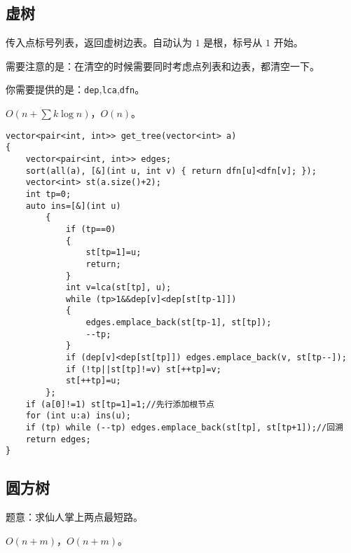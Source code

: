 \documentclass[12pt]{ctexart}
\begin{document}
\subsection{虚树}

传入点标号列表，返回虚树边表。自动认为 $1$ 是根，标号从 $1$ 开始。

需要注意的是：在清空的时候需要同时考虑点列表和边表，都清空一下。

你需要提供的是：\verb|dep|,\verb|lca|,\verb|dfn|。

$O(n+\sum k\log n)$，$O(n)$。

\begin{lstlisting}
vector<pair<int, int>> get_tree(vector<int> a)
{
	vector<pair<int, int>> edges;
	sort(all(a), [&](int u, int v) { return dfn[u]<dfn[v]; });
	vector<int> st(a.size()+2);
	int tp=0;
	auto ins=[&](int u)
		{
			if (tp==0)
			{
				st[tp=1]=u;
				return;
			}
			int v=lca(st[tp], u);
			while (tp>1&&dep[v]<dep[st[tp-1]])
			{
				edges.emplace_back(st[tp-1], st[tp]);
				--tp;
			}
			if (dep[v]<dep[st[tp]]) edges.emplace_back(v, st[tp--]);
			if (!tp||st[tp]!=v) st[++tp]=v;
			st[++tp]=u;
		};
	if (a[0]!=1) st[tp=1]=1;//先行添加根节点
	for (int u:a) ins(u);
	if (tp) while (--tp) edges.emplace_back(st[tp], st[tp+1]);//回溯
	return edges;
}
\end{lstlisting}

\subsection{圆方树}

题意：求仙人掌上两点最短路。

$O(n+m)$，$O(n+m)$。
\end{document}

